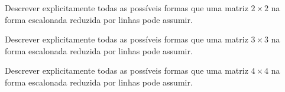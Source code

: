 \documentclass[12pt]{exam}
\begin{document}
\begin{exercicio}
  Descrever explicitamente todas as possíveis formas que uma matriz $2 \times 2$ na forma escalonada reduzida por linhas pode assumir.
\end{exercicio}

\begin{exercicio}
  Descrever explicitamente todas as possíveis formas que uma matriz $3 \times 3$ na forma escalonada reduzida por linhas pode assumir.
\end{exercicio}

\begin{exercicio}
  Descrever explicitamente todas as possíveis formas que uma matriz $4 \times 4$ na forma escalonada reduzida por linhas pode assumir.
\end{exercicio}
\end{document}
